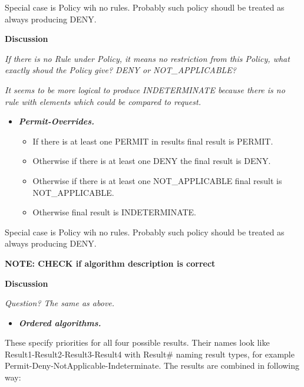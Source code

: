 \documentclass{article}
\newcommand\liststyleWWviiiNumxxi{%
\renewcommand\labelitemi{[F0B7?]}
\renewcommand\labelitemii{o}
\renewcommand\labelitemiii{[F0A7?]}
\renewcommand\labelitemiv{[F0B7?]}
}
\begin{document}
{\color{black}
Special case is Policy wih no rules. Probably such policy shoudl be
treated as always producing DENY.}

{\bfseries\color{black}
Discussion}

{\itshape\color{black}
If there is no Rule under Policy, it means no restriction from this
Policy, what exactly shoud the Policy give? DENY or NOT\_APPLICABLE?}

{\itshape\color{black}
It seems to be more logical to produce INDETERMINATE because there is no
rule with elements which could be compared to request.}

\liststyleWWviiiNumxxi
\begin{itemize}
\item {\bfseries\itshape\color{black}
Permit-Overrides.}

\begin{itemize}
\item {\color{black}
If there is at least one PERMIT in results final result is PERMIT.}
\item {\color{black}
Otherwise if there is at least one DENY the final result is DENY.}
\item {\color{black}
Otherwise if there is at least one NOT\_APPLICABLE final result is
NOT\_APPLICABLE.}
\item {\color{black}
Otherwise final result is INDETERMINATE.}
\end{itemize}
\end{itemize}
{\color{black}
Special case is Policy wih no rules. Probably such policy should be
treated as always producing DENY.}

{\bfseries\color{black}
NOTE: CHECK if algorithm description is correct}

{\bfseries\color{black}
Discussion}

{\itshape\color{black}
Question? The same as above.}

\liststyleWWviiiNumxxi
\begin{itemize}
\item {\bfseries\itshape\color{black}
Ordered algorithms.}
\end{itemize}
{\color{black}
These specify priorities for all four possible results. Their names look
like Result1-Result2-Result3-Result4 with Result\# naming result types,
for example Permit-Deny-NotApplicable-Indeterminate. The results are
combined in following way:}
\end{document}
